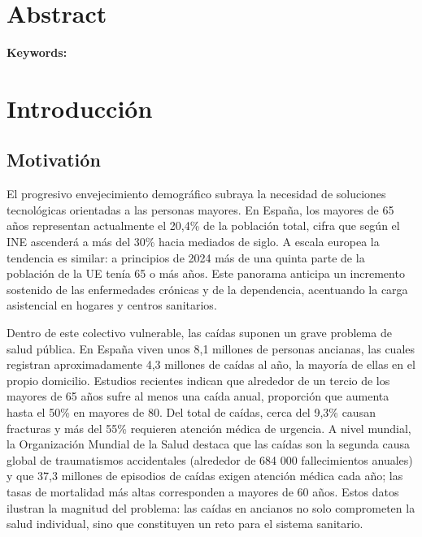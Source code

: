 \documentclass[12pt, a4paper]{article}
\begin{document}





\begin{abstract}
    

	{\bfseries\large Palabras clave:} 

\end{abstract}

\section*{Abstract}

	
	
	{\bfseries\large Keywords:} 

\tableofcontents

\section{Introducción}

	\subsection{Motivatión}
    
    El progresivo envejecimiento demográfico subraya la necesidad de soluciones tecnológicas orientadas a las personas mayores. En España, los mayores de 65 años representan actualmente el 20,4\% de la población total, cifra que según el INE ascenderá a más del 30\% hacia mediados de siglo\cite{INE2024}. A escala europea la tendencia es similar: a principios de 2024 más de una quinta parte de la población de la UE tenía 65 o más años\cite{Euro2025}. Este panorama anticipa un incremento sostenido de las enfermedades crónicas y de la dependencia, acentuando la carga asistencial en hogares y centros sanitarios.
    
    Dentro de este colectivo vulnerable, las caídas suponen un grave problema de salud pública. En España viven unos 8,1 millones de personas ancianas, las cuales registran aproximadamente 4,3 millones de caídas al año, la mayoría de ellas en el propio domicilio\cite{Rodriguez2015}. Estudios recientes indican que alrededor de un tercio de los mayores de 65 años sufre al menos una caída anual, proporción que aumenta hasta el 50\% en mayores de 80. Del total de caídas, cerca del 9,3\% causan fracturas y más del 55\% requieren atención médica de urgencia. A nivel mundial, la Organización Mundial de la Salud destaca que las caídas son la segunda causa global de traumatismos accidentales (alrededor de 684 000 fallecimientos anuales) y que 37,3 millones de episodios de caídas exigen atención médica cada año; las tasas de mortalidad más altas corresponden a mayores de 60 años\cite{OMS2021}. Estos datos ilustran la magnitud del problema: las caídas en ancianos no solo comprometen la salud individual, sino que constituyen un reto para el sistema sanitario.
    
\end{document}
